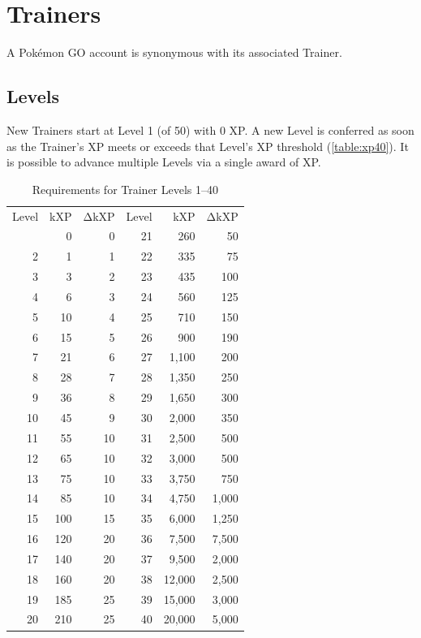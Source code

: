 \chapter{Trainers}
A Pokémon GO account is synonymous with its associated Trainer.

\section{Levels\label{sec:levels}}
New Trainers start at Level 1 (of 50) with 0 XP\@.
A new Level is conferred as soon as the Trainer's XP meets or exceeds
  that Level's XP threshold (\autoref{table:xp40}).
It is possible to advance multiple Levels via a single award of XP\@.
\begin{table}
\centering
\begin{tabular}{r r r|r r r}
  Level & kXP & ΔkXP & Level & kXP & ΔkXP \\
\Midrule
1 & 0 & 0 & 21 & 260 & 50 \\
2 & 1 & 1 & 22 & 335 & 75 \\
3 & 3 & 2 & 23 & 435 & 100 \\
4 & 6 & 3 & 24 & 560 & 125 \\
5 & 10 & 4 & 25 & 710 & 150 \\
6 & 15 & 5 & 26 & 900 & 190 \\
7 & 21 & 6 & 27 & 1,100 & 200 \\
8 & 28 & 7 & 28 & 1,350 & 250 \\
9 & 36 & 8 & 29 & 1,650 & 300 \\
10 & 45 & 9 & 30 & 2,000 & 350 \\
11 & 55 & 10 & 31 & 2,500 & 500 \\
12 & 65 & 10 & 32 & 3,000 & 500 \\
13 & 75 & 10 & 33 & 3,750 & 750 \\
14 & 85 & 10 & 34 & 4,750 & 1,000 \\
15 & 100 & 15 & 35 & 6,000 &1,250  \\
16 & 120 & 20 & 36 & 7,500 &7,500  \\
17 & 140 & 20 & 37 & 9,500 &2,000  \\
18 & 160 & 20 & 38 & 12,000&2,500   \\
19 & 185 & 25 & 39 & 15,000&3,000   \\
20 & 210 & 25 & 40 & 20,000&5,000   \\
\end{tabular}
\caption{Requirements for Trainer Levels 1--40\label{table:xp40}}
\end{table}
